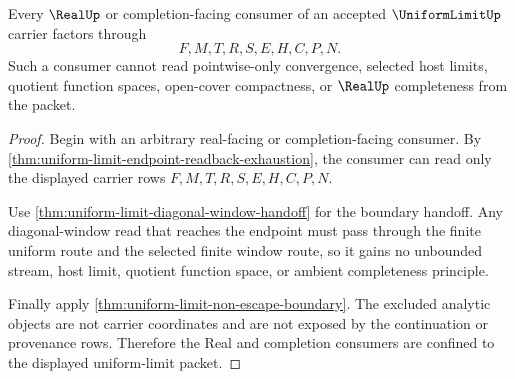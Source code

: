 \begin{theorem}
\label{thm:uniform-limit-completion-consumer-boundary}
Every $\RealUp$ or completion-facing consumer of an accepted $\UniformLimitUp$ carrier factors through
$$
F,M,T,R,S,E,H,C,P,N.
$$
Such a consumer cannot read pointwise-only convergence, selected host limits, quotient function spaces, open-cover compactness, or $\RealUp$ completeness from the packet.
\end{theorem}
\begin{proof}
Begin with an arbitrary real-facing or completion-facing consumer. By \autoref{thm:uniform-limit-endpoint-readback-exhaustion}, the consumer can read only the displayed carrier rows $F,M,T,R,S,E,H,C,P,N$.

Use \autoref{thm:uniform-limit-diagonal-window-handoff} for the boundary handoff. Any diagonal-window read that reaches the endpoint must pass through the finite uniform route and the selected finite window route, so it gains no unbounded stream, host limit, quotient function space, or ambient completeness principle.

Finally apply \autoref{thm:uniform-limit-non-escape-boundary}. The excluded analytic objects are not carrier coordinates and are not exposed by the continuation or provenance rows. Therefore the Real and completion consumers are confined to the displayed uniform-limit packet.
\end{proof}

